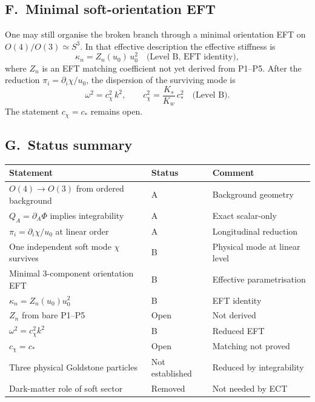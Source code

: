 \documentclass[11pt,a4paper]{article}
\numberwithin{equation}{section}
\begin{document}
\subsection*{F.\ Minimal soft-orientation EFT}

One may still organise the broken branch through a minimal orientation
EFT on $O(4)/O(3)\simeq S^3$.
In that effective description the effective stiffness is
\begin{equation}
  \kappa_n = Z_n(u_0)\,u_0^2 \quad\text{(Level~B, EFT identity)},
  \label{eq:app_kappan}
\end{equation}
where $Z_n$ is an EFT matching coefficient not yet derived from P1--P5.
After the reduction $\pi_i=\partial_i\chi/u_0$, the dispersion of the
surviving mode is
\begin{equation}
  \omega^2=c_\chi^2\,k^2, \qquad
  c_\chi^2=\frac{K_s}{K_w}\,c_*^2 \quad\text{(Level~B)}.
  \label{eq:app_chi_dispersion}
\end{equation}
The statement $c_\chi=c_*$ remains open.

\subsection*{G.\ Status summary}

\begin{center}
\renewcommand{\arraystretch}{1.2}
\begin{tabular}{p{} p{} p{}}
\hline
Statement & Status & Comment \\
\hline
$O(4)\to O(3)$ from ordered background & A & Background geometry \\
$Q_A=\partial_A\Phi$ implies integrability & A & Exact scalar-only \\
$\pi_i=\partial_i\chi/u_0$ at linear order & A & Longitudinal reduction \\
One independent soft mode $\chi$ survives & B & Physical mode at linear level \\
Minimal 3-component orientation EFT & B & Effective parametrisation \\
$\kappa_n=Z_n(u_0)u_0^2$ & B & EFT identity \\
$Z_n$ from bare P1--P5 & Open & Not derived \\
$\omega^2=c_\chi^2k^2$ & B & Reduced EFT \\
$c_\chi=c_*$ & Open & Matching not proved \\
Three physical Goldstone particles & Not established & Reduced by integrability \\
Dark-matter role of soft sector & Removed & Not needed by ECT \\
\hline
\end{tabular}
\end{center}
\end{document}
